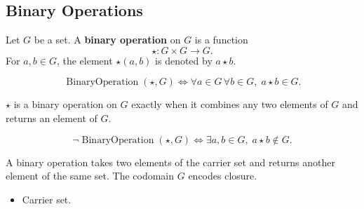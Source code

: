 \subsection{Binary Operations}
\label{subsec:binary-operations}

\begin{tcolorbox}[title={Definition --- Binary Operation}]
\begin{definition}
\label{def:binary-operation}
Let $G$ be a set.
A \textbf{binary operation} on $G$ is a function
\[
\star : G \times G \to G.
\]
For $a,b \in G$, the element $\star(a,b)$ is denoted by $a \star b$.
\end{definition}
\end{tcolorbox}

\begin{remark*}
\[
\operatorname{BinaryOperation}(\star,G)
\Longleftrightarrow
\forall a \in G\, \forall b \in G,\; a \star b \in G.
\]
\end{remark*}

\begin{remark*}
$\star$ is a binary operation on $G$ exactly when it combines any two elements
of $G$ and returns an element of $G$.
\end{remark*}

\begin{remark*}
\[
\neg\operatorname{BinaryOperation}(\star,G)
\Longleftrightarrow
\exists a,b\in G,\; a\star b\notin G.
\]
\end{remark*}

\begin{remark*}[Interpretation]
A binary operation takes two elements of the carrier set and returns another
element of the same set.  The codomain $G$ encodes closure.
\end{remark*}

\begin{remark*}[Dependencies]
\begin{itemize}
  \item Carrier set.
\end{itemize}
\end{remark*}
